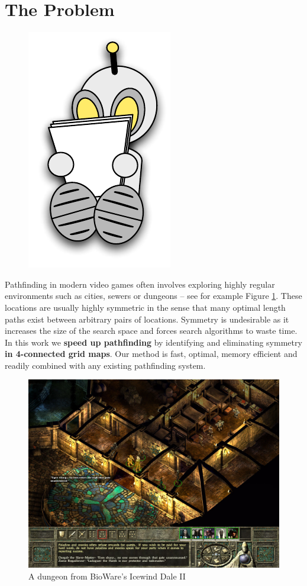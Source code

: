 \section{The Problem}
 \begin{figure}
\vspace{-3em}
		\includegraphics[width=0.18\columnwidth]{diagrams/robot_reading.pdf}
 \end{figure}

Pathfinding in modern video games often involves exploring highly regular 
environments such as cities, sewers or dungeons -- see for example
Figure \ref{fig:iw2}.
These locations are usually highly symmetric in the sense that many optimal 
length paths exist between arbitrary pairs of locations.
Symmetry is undesirable as it increases the size of the search space and forces
search algorithms to waste time.
\newline
In this work we \textbf{speed up pathfinding} by identifying and eliminating
symmetry \textbf{in 4-connected grid maps}.
Our method is fast, optimal, memory efficient and readily combined with any
existing pathfinding system.

 \begin{figure}[h]
	\vspace{1em}
	\centering
	\label{fig:iw2}
		\includegraphics[width=\columnwidth]{diagrams/iwdale.jpg}
 \caption{A dungeon from BioWare's Icewind Dale II}
 \end{figure}

